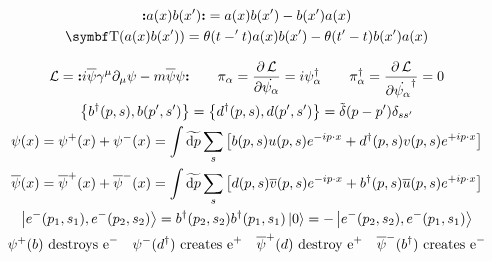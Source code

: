 \begin{gather*}
        \nord{a(x)b(x')} = a(x)b(x') - b(x')a(x)
        \\
        \Tordp(a(x)b(x')) = \theta(t-'t)a(x)b(x') - \theta(t'-t)b(x')a(x)
\end{gather*}

\begin{gather*}
        \Lc = \nord{i\overline{\psi}\gamma^\mu\partial_\mu\psi - m\overline{\psi}\psi}
        \qquad
        \pi_\alpha = \pdv{\Lc}{\dot{\psi_\alpha}} = i\psi_\alpha^\dagger
        \qquad
        \pi_\alpha^\dagger = \pdv{\Lc}{\dot{\psi_\alpha}^\dagger} = 0
        \\
        \acomm{b^\dagger\qty(p,s)}{b\qty(p',s')}
        = \acomm{d^\dagger\qty(p,s)}{d\qty(p',s')}
        = \Tdelta(p-p')\delta_{ss'}
        \\
        \psi(x)
        = \psi^+(x) + \psi^-(x)
        = \int\Tdd{p}\sum_s \qty[b(p,s)u(p,s)e^{-ip\cdot x} + d^\dagger(p,s)v(p,s)e^{+ip\cdot x}]
        \\
        \overline{\psi}(x)
        = \overline{\psi}^+(x) + \overline{\psi}^-(x)
        = \int\Tdd{p}\sum_s \qty[d(p,s)\overline{v}(p,s)e^{-ip\cdot x} + b^\dagger(p,s)\overline{u}(p,s)e^{+ip\cdot x}]
        \\
        \ket{e^-(p_1,s_1),e^-(p_2,s_2)} = b^\dagger(p_2,s_2)b^\dagger(p_1,s_1)\ket{0} = -\ket{e^-(p_2,s_2),e^-(p_1,s_1)}
        \\
        \psi^+(b) \text{ destroys } \ce{e^-}
        \quad
        \psi^-(d^\dagger) \text{ creates } \ce{e^+}
        \quad
        \overline{\psi}^+(d) \text{ destroy } \ce{e^+}
        \quad
        \overline{\psi}^-(b^\dagger) \text{ creates } \ce{e^-}
\end{gather*}
